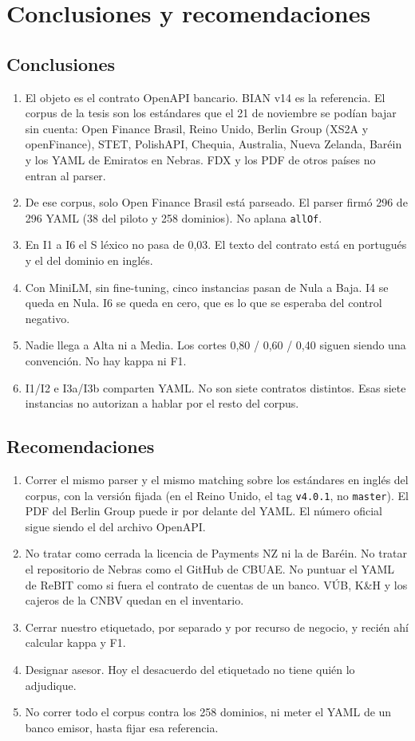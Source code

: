 \chapter{Conclusiones y recomendaciones}

\section{Conclusiones}

\begin{enumerate}
  \item El objeto es el contrato OpenAPI bancario. BIAN v14 es la referencia. El corpus de la tesis son los estándares que el 21 de noviembre se podían bajar sin cuenta: Open Finance Brasil, Reino Unido, Berlin Group (XS2A y openFinance), STET, PolishAPI, Chequia, Australia, Nueva Zelanda, Baréin y los YAML de Emiratos en Nebras. FDX y los PDF de otros países no entran al parser.
  \item De ese corpus, solo Open Finance Brasil está parseado. El parser firmó 296 de 296 YAML (38 del piloto y 258 dominios). No aplana \texttt{allOf}.
  \item En I1 a I6 el S léxico no pasa de 0,03. El texto del contrato está en portugués y el del dominio en inglés.
  \item Con MiniLM, sin fine-tuning, cinco instancias pasan de Nula a Baja. I4 se queda en Nula. I6 se queda en cero, que es lo que se esperaba del control negativo.
  \item Nadie llega a Alta ni a Media. Los cortes 0,80 / 0,60 / 0,40 siguen siendo una convención. No hay kappa ni F1.
  \item I1/I2 e I3a/I3b comparten YAML. No son siete contratos distintos. Esas siete instancias no autorizan a hablar por el resto del corpus.
\end{enumerate}

\section{Recomendaciones}

\begin{enumerate}
  \item Correr el mismo parser y el mismo matching sobre los estándares en inglés del corpus, con la versión fijada (en el Reino Unido, el tag \texttt{v4.0.1}, no \texttt{master}). El PDF del Berlin Group puede ir por delante del YAML. El número oficial sigue siendo el del archivo OpenAPI.
  \item No tratar como cerrada la licencia de Payments NZ ni la de Baréin. No tratar el repositorio de Nebras como el GitHub de CBUAE. No puntuar el YAML de ReBIT como si fuera el contrato de cuentas de un banco. VÚB, K\&H y los cajeros de la CNBV quedan en el inventario.
  \item Cerrar nuestro etiquetado, por separado y por recurso de negocio, y recién ahí calcular kappa y F1.
  \item Designar asesor. Hoy el desacuerdo del etiquetado no tiene quién lo adjudique.
  \item No correr todo el corpus contra los 258 dominios, ni meter el YAML de un banco emisor, hasta fijar esa referencia.
\end{enumerate}
